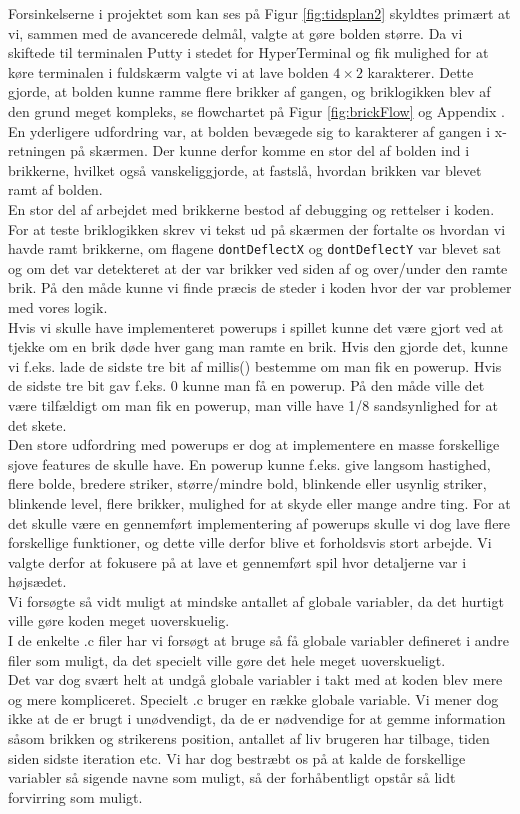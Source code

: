 Forsinkelserne i projektet som kan ses på Figur \ref{fig:tidsplan2} skyldtes primært at vi, sammen med de avancerede delmål, valgte at gøre bolden større. Da vi skiftede til terminalen Putty i stedet for HyperTerminal og fik mulighed for at køre terminalen i fuldskærm valgte vi at lave bolden $4\times2$ karakterer. Dette gjorde, at bolden kunne ramme flere brikker af gangen, og briklogikken blev af den grund meget kompleks, se flowchartet på Figur \ref{fig:brickFlow} og  Appendix . En yderligere udfordring var, at bolden bevægede sig to karakterer af gangen i x-retningen på skærmen. Der kunne derfor komme en stor del af bolden ind i brikkerne, hvilket også vanskeliggjorde, at fastslå, hvordan brikken var blevet ramt af bolden. \\ 
En stor del af arbejdet med brikkerne bestod af debugging og rettelser i koden. For at teste briklogikken skrev vi tekst ud på skærmen der fortalte os hvordan vi havde ramt brikkerne, om flagene \texttt{dontDeflectX} og \texttt{dontDeflectY} var blevet sat og om det var detekteret at der var brikker ved siden af og over/under den ramte brik. På den måde kunne vi finde præcis de steder i koden hvor der var problemer med vores logik.\\

Hvis vi skulle have implementeret powerups i spillet kunne det være gjort ved at tjekke om en brik døde hver gang man ramte en brik. Hvis den gjorde det, kunne vi f.eks. lade de sidste tre bit af millis() bestemme om man fik en powerup. Hvis de sidste tre bit gav f.eks. 0 kunne man få en powerup. På den måde ville det være tilfældigt om man fik en powerup, man ville have 1/8 sandsynlighed for at det skete. \\

Den store udfordring med powerups er dog at implementere en masse forskellige sjove features de skulle have. En powerup kunne f.eks. give langsom hastighed, flere bolde, bredere striker, større/mindre bold, blinkende eller usynlig striker, blinkende level, flere brikker, mulighed for  at skyde eller mange andre ting. For at det skulle være en gennemført implementering af powerups skulle vi dog lave flere forskellige funktioner, og dette ville derfor blive et forholdsvis stort arbejde. Vi valgte derfor at fokusere på at lave et gennemført spil hvor detaljerne var i højsædet.\\

Vi forsøgte så vidt muligt at mindske antallet af globale variabler, da det hurtigt ville gøre koden meget uoverskuelig.\\
I de enkelte .c filer har vi forsøgt at bruge så få globale variabler defineret i andre filer som muligt, da det specielt ville gøre det hele meget uoverskueligt. \\
Det var dog svært helt at undgå globale variabler i takt med at koden blev mere og mere kompliceret. Specielt .c bruger en række globale variable. Vi mener dog ikke at de er brugt i unødvendigt, da de er nødvendige for at gemme information såsom brikken og strikerens position, antallet af liv brugeren har tilbage, tiden siden sidste iteration etc.
Vi har dog bestræbt os på at kalde de forskellige variabler så sigende navne som muligt, så der forhåbentligt opstår så lidt forvirring som muligt. 